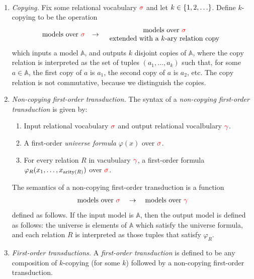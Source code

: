 \begin{definition}\label{def:fo-transduction-gen}\ 
\begin{enumerate}
    \item \emph{Copying.} Fix some  relational vocabulary ${\color{red}{\sigma}}$ and let $k \in \{1,2,\ldots\}$. Define $k$-copying to be the operation 
    $$\begin{array}{lll}
     \text{models over ${\color{red}{\sigma}}$} & \to & 
     \begin{array}{c}
     \text{models over ${\color{red}{\sigma}}$}\\ 
     \text{extended with a $k$-ary relation $\mathrm{copy}$}
     \end{array}
    \end{array}$$
which inputs a model $\mathbb A$, and outputs $k$ disjoint copies of $\mathbb A$, where the  $\mathrm{copy}$ relation is interpreted as the set of tuples $(a_1,\ldots,a_k)$ such that, for  some $a \in \mathbb A$, the first copy of $a$ is  $a_1$, the second copy of $a$ is $a_2$, etc. The $\mathrm{copy}$ relation  is not commutative, because we distinguish the copies.
\item    \emph{Non-copying first-order transduction.} The syntax of a \emph{non-copying first-order transduction}  is given by:
\begin{enumerate}
    \item Input relational vocabulary ${\color{red}{\sigma}}$ and output relational vocalbulary ${\color{red}{\gamma}}$.
    \item A first-order \emph{universe formula} $\varphi(x)$ over ${\color{red}{\sigma}}$.
    \item For every relation $R$ in vacubulary ${\color{red}{\gamma}}$, a first-order  formula $\varphi_R(x_1,\ldots,x_{\mathrm{arity}(R)})$ over ${\color{red}{\sigma}}$.
\end{enumerate}
The semantics of a non-copying first-order transduction is  a function
\begin{align*}
    \text{models over ${\color{red}{\sigma}}$} \quad \to \quad \text{models over ${\color{red}{\gamma}}$}
\end{align*}
defined as follows. If the input model is $\mathbb A$, then the output model is defined as follows: the universe is elements of $\mathbb A$ which satisfy the universe formula, and each relation $R$ is interpreted as those tuples that satisfy $\varphi_R$. 
\item \emph{First-order transductions.} A \emph{first-order transduction} is defined to be any  composition of $k$-copying (for some $k$) followed by a non-copying first-order transduction. 
 \end{enumerate}
\end{definition}

